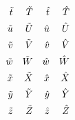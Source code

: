 \begin{align*}
  \tilde{\mathnormal{t}}&&\tilde{\mathnormal{T}}&&\hat{\mathnormal{t}}&&\hat{\mathnormal{T}}\\
  \tilde{\mathnormal{u}}&&\tilde{\mathnormal{U}}&&\hat{\mathnormal{u}}&&\hat{\mathnormal{U}}\\
  \tilde{\mathnormal{v}}&&\tilde{\mathnormal{V}}&&\hat{\mathnormal{v}}&&\hat{\mathnormal{V}}\\
  \tilde{\mathnormal{w}}&&\tilde{\mathnormal{W}}&&\hat{\mathnormal{w}}&&\hat{\mathnormal{W}}\\
  \tilde{\mathnormal{x}}&&\tilde{\mathnormal{X}}&&\hat{\mathnormal{x}}&&\hat{\mathnormal{X}}\\
  \tilde{\mathnormal{y}}&&\tilde{\mathnormal{Y}}&&\hat{\mathnormal{y}}&&\hat{\mathnormal{Y}}\\
  \tilde{\mathnormal{z}}&&\tilde{\mathnormal{Z}}&&\hat{\mathnormal{z}}&&\hat{\mathnormal{Z}}
\end{align*}

